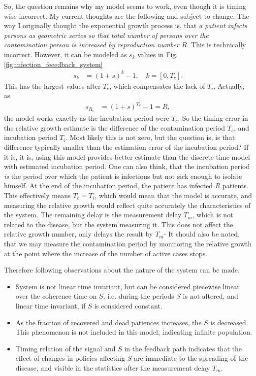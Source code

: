 So, the
question remains why my model seems to work, even though it is timing wise
incorrect. My current thoughts are the following and subject to change. The
way I originally thought the exponential growth process is, that \emph{a
    patient infects persons as geometric series so that total number of persons over the
contamination person is increased by reproduction number $R$}. This is technically incorrect.
However, it can be modeled as $s_k$  values in Fig. \ref{fig:infection_feeedback_system}
\begin{align}
    s_k&=\left(1+s\right)^k-1, \quad k=\left[0,T_c\right].
\end{align}
This has the largest values after $T_c$, which compensates the lack of $T_i$.
Actually, as  
\begin{align}
    s_{R_c}&=\left(1+s\right)^{T_c}-1=R,
\end{align}
the model works exactly as the incubation period were $T_c$. So the timing
error in the relative growth estimate is the difference of the contamination
period $T_c$, and incubation period $T_i$. Most likely this is not zero, but
the question is, is that difference typically smaller than the estimation
error of the incubation period? If it is, it is, using this model provides
better estimate than the discrete time model with estimated
incubation period. One can also think, that the incubation period \emph{is}
the period over which the patient is infectious but not sick enough to isolate
himself. At the end of the incubation period, the patient has infected $R$
patients. This effectively means $T_c=T_i$, which would mean that the model is
accurate, and measuring the relative growth would reflect quite accurately the
characteristics of the system. The remaining delay is the measurement delay
$T_m$, which is not related to the disease, but the system measuring it. This
does not affect the relative growth number, only delays the result by $T_m$-
It should also be noted, that we may measure the contamination period by
monitoring the relative growth at the point where the increase of the number
of active cases stops. 

Therefore following observations about the nature of the
system can be made.
\begin{itemize}
    \item System is not linear time invariant, but can be considered piecewise
        linear over
        the coherence time on $S$, i.e. during the periods $S$ is not altered,
        and linear time invariant, if $S$ is considered constant.
    \item As the fraction of recovered and dead patiences increases, the $S$
        is decreased. This phenomenon is not included in this model,
        indicating infinite population.
    \item Timing relation of the signal and $S$ in the feedback path indicates
        that the effect of changes in policies affecting $S$ are immediate to
        the spreading of the disease, and visible in the statistics after the
        measurement delay $T_m$.
\end{itemize}

